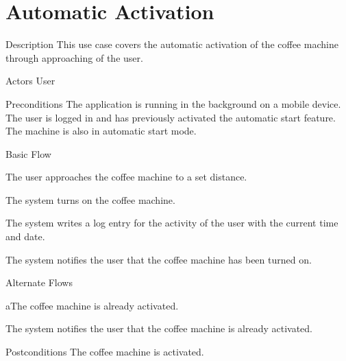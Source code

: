 \section{Automatic Activation}

\begin{cpart}{Description}
This use case covers the automatic activation of the coffee machine through approaching of the user.
\end{cpart}

\begin{cpart}{Actors}
User
\end{cpart}

\begin{cpart}{Preconditions}
The application is running in the background on a mobile device. The user is logged in and has previously activated the automatic start feature. The machine is also in automatic start mode.
\end{cpart}

\begin{cpartList}{Basic Flow}
  \item The user approaches the coffee machine to a set distance.
  \item The system turns on the coffee machine.
  \item The system writes a log entry for the activity of the user with the current time and date.
  \item The system notifies the user that the coffee machine has been turned on.
\end{cpartList}

\begin{cpartList}{Alternate Flows}
  \begin{innerList}{2}{a}{The coffee machine is already activated.}
    \item The system notifies the user that the coffee machine is already activated.
  \end{innerList}
\end{cpartList}

\begin{cpart}{Postconditions}
The coffee machine is activated.
\end{cpart}

\clearpage
